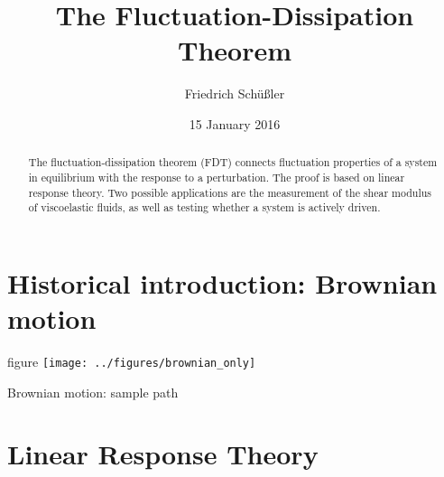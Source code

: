 \documentclass[a4paper]{tufte-handout}
\title{The Fluctuation-Dissipation Theorem}
\author{Friedrich Schüßler}
\date{15 January 2016}  %
\makeatletter
\renewenvironment{marginfigure}[1][-1.2ex]%
  {\begin{@tufte@margin@float}[#1]{figure}%
    \captionsetup{labelformat=empty}}%
  {\end{@tufte@margin@float}}
\makeatother
\begin{document}
\maketitle%

\begin{abstract}
\noindent The fluctuation-dissipation theorem (FDT) connects fluctuation properties
of a system in equilibrium with the response to a perturbation.
The proof is based on linear response theory.
Two possible applications are the 
measurement of the shear modulus of viscoelastic fluids,
as well as testing whether a system is actively driven.
\end{abstract}

\section{Historical introduction: Brownian motion}
\label{sec:historical_introduction}

\begin{marginfigure}[1cm]%
    \texttt{[image: ../figures/brownian\_only]}
\caption{Brownian motion: sample path}
\end{marginfigure}



\section{Linear Response Theory}
\label{sec:linear_response_theory}
\end{document}
